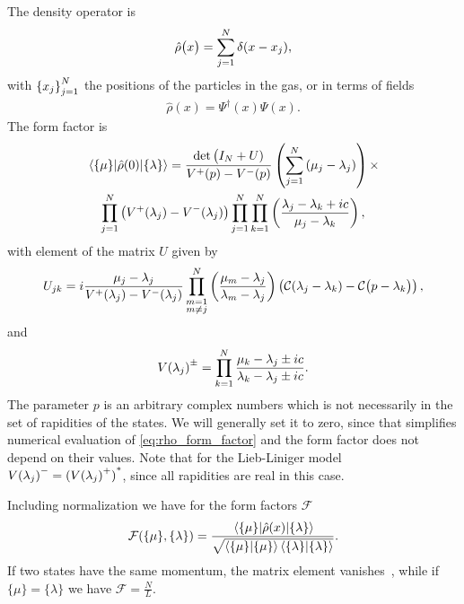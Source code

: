\documentclass[11pt, a4paper]{report} %
\begin{document}
The density operator is
\begin{align}
  \hat{\rho}\qty\big(x) = \sum_{j=1}^N \delta\qty(x-x_j),
\end{align}
with \({\qty{x_j}}_{j=1}^N\) the positions of the particles in the gas, or in terms of fields
\begin{align}
  \label{eq:44}
  \hat{\rho}(x) = \Psi^{\dag}(x)\Psi(x).
\end{align}
The form factor is~\cite{slavnov90_noneq_time_curren_correl_funct}
\begin{multline}
  \label{eq:rho_form_factor}
  \matrixel{\{\mu\}}{\hat{\rho}(0)}{\{\lambda\}} = \frac{\det\big(I_N +U)}{V^+(p) - V^-(p)}
  \left(\sum_{j=1}^N\qty(\mu_j-\lambda_j)\right) \times\\ \prod_{j=1}^N\left(V^+\qty(\lambda_j) - V^-\qty(\lambda_j)\right)\prod_{j=1}^N\prod_{k=1}^N\left(\frac{\lambda_j-\lambda_k+ic}{\mu_j-\lambda_k}\right),
\end{multline}
with element of the matrix \(U\) given by
\begin{align}
  U_{jk} = i \frac{\mu_j-\lambda_j}{V^+\qty(\lambda_j) -V^-\qty(\lambda_j)}\prod_{\substack{m=1\\m\neq j}}^N \left(\frac{\mu_m - \lambda_j}{\lambda_m-\lambda_j}\right) \left(\mathcal{C}\qty(\lambda_j- \lambda_k) - \mathcal{C}\qty\big(p- \lambda_k)\right),
\end{align}
and 
\begin{align}
  \label{eq:56}
  V{\qty(\lambda_j)}^{\pm} = \prod_{k=1}^N \frac{\mu_k-\lambda_j\pm ic}{\lambda_k-\lambda_j\pm ic}.
\end{align}
The parameter \(p\) is an arbitrary complex numbers which is not necessarily in the set of rapidities of the states.
We will generally set it to zero, since that simplifies numerical evaluation of \cref{eq:rho_form_factor} and the form factor does not depend on their values.
Note that for the Lieb-Liniger model \(V{\qty(\lambda_j)}^{-} = {(V{\qty(\lambda_j)}^{+})}^{*}\), since all rapidities are real in this case.

Including normalization we have for the form factors \(\mathcal{F}\)~\cite{Nardis2015}
\begin{align}
  \label{eq:21}
  \mathcal{F}(\{\mu\}, \{\lambda\}) = \frac{\matrixel{\{\mu\}}{\hat{\rho}(x)}{\{\lambda\}}}{\sqrt{\innerproduct{\{\mu\}}{\{\mu\}}\innerproduct{\{\lambda\}}{\{\lambda\}}}}.
\end{align}
If two states have the same momentum, the matrix element vanishes~\cite{slavnov90_noneq_time_curren_correl_funct}, while if $\{\mu\} = \{\lambda\}$ we have $\mathcal{F}=\frac{N}{L}$.
\end{document}
